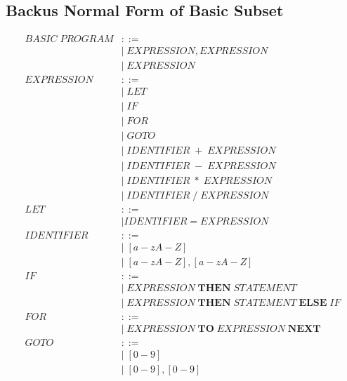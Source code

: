 \documentclass{report}
\begin{document}
\subsection*{Backus Normal Form of Basic Subset}
\begin{align*}
BASIC \; PROGRAM &::=							\\ 
	&|\; EXPRESSION, EXPRESSION 					\\
	&|\; EXPRESSION							\\
	EXPRESSION &::=							\\
	&|\; LET							\\
	&|\; IF								\\
	&|\; FOR 							\\
	&|\; GOTO							\\
	&|\; IDENTIFIER\;+\;EXPRESSION					\\
	&|\; IDENTIFIER\;-\;EXPRESSION					\\
	&|\; IDENTIFIER\;*\;EXPRESSION					\\
	&|\; IDENTIFIER\;/\;EXPRESSION					\\
	LET &::=							\\
	&| IDENTIFIER = EXPRESSION					\\
	IDENTIFIER &::=							\\
	&|\; [a-zA-Z] 							\\
	&|\; [a-zA-Z],[a-zA-Z]						\\
	IF &::=								\\
	&|\; EXPRESSION\;\textbf{THEN}\;STATEMENT			\\
	&|\; EXPRESSION\;\textbf{THEN}\;STATEMENT\;\textbf{ELSE}\;IF	\\
	FOR &::=							\\
	&|\;EXPRESSION\;\textbf{TO}\;EXPRESSION\;\textbf{NEXT}		\\
	GOTO &::=							\\
	&|\; [0-9] 							\\
	&|\; [0-9],[0-9] 						\\
\end{align*}
\end{document}
